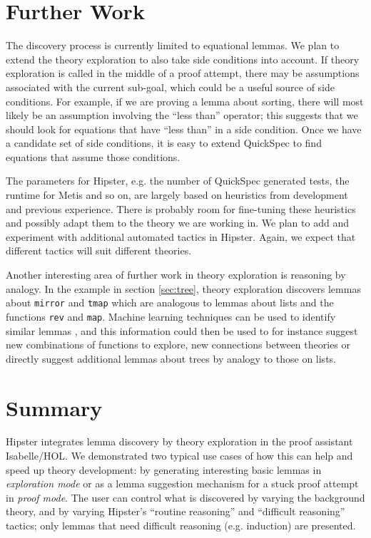 \section{Further Work}
\label{sec:further}
The discovery process is currently limited to equational lemmas. We
plan to extend the theory exploration to also take side conditions
into account. If theory exploration is called in the middle of a proof
attempt, there may be assumptions associated with the current
sub-goal, which could be a useful source of side conditions. For
example, if we are proving a lemma about sorting, there will most
likely be an assumption involving the ``less than'' operator; this
suggests that we should look for equations that have ``less than'' in
a side condition. Once we have a candidate set of side conditions, it
is easy to extend QuickSpec to find equations that assume those conditions.

The parameters for Hipster, e.g. the number of QuickSpec generated tests, the runtime for Metis and so on, are largely based on heuristics from development and previous experience. There is probably room for fine-tuning these heuristics and possibly adapt them to the theory we are working in. We plan to add and experiment with additional automated tactics in Hipster. Again, we expect that different tactics will suit different theories.
 
Another interesting area of further work in theory exploration is reasoning by analogy. In the example in section \ref{sec:tree}, theory exploration discovers lemmas about \texttt{mirror} and \texttt{tmap} which are analogous to lemmas about lists and the functions \texttt{rev} and \texttt{map}. Machine learning techniques can be used to identify similar lemmas \cite{acl2ml}, and this information could then be used to for instance suggest new combinations of functions to explore, new connections between theories or directly suggest additional lemmas about trees by analogy to those on lists.

\section{Summary}
\label{sec:concl}

Hipster integrates lemma discovery by theory exploration in the proof
assistant Isabelle/HOL. We demonstrated two typical use cases of how this
can help and speed up theory development: by generating interesting
basic lemmas in \emph{exploration mode} or as a lemma suggestion
mechanism for a stuck proof attempt in \emph{proof mode}. The user can
control what is discovered by varying the background theory, and by
varying Hipster's ``routine reasoning'' and ``difficult reasoning''
tactics; only lemmas that need difficult reasoning (e.g. induction)
are presented.

